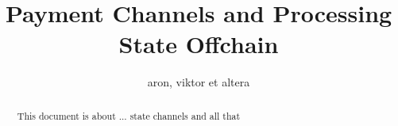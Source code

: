 \documentclass[a4paper,10pt]{article}
\title{Payment Channels and Processing State Offchain}
\author{aron, viktor et altera}
\begin{document}
\maketitle
 \begin{abstract}
  This document is about ... state channels and all that
 \end{abstract}
 
\tableofcontents
 

\pagebreak
 

\pagebreak
 






\end{document}
